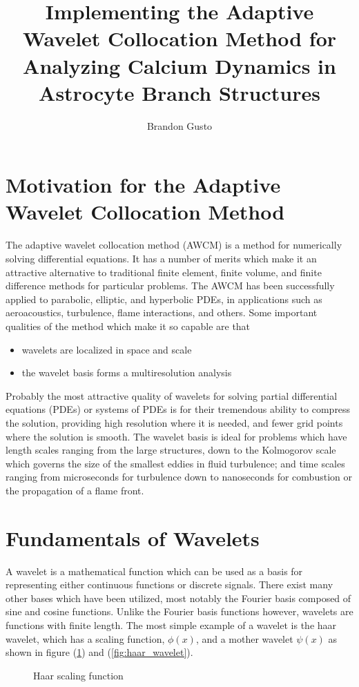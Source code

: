 \documentclass[11pt]{article}
\begin{document}
\title{Implementing the Adaptive Wavelet Collocation Method for Analyzing Calcium Dynamics 
in Astrocyte Branch Structures}
\author{Brandon Gusto \\}

\maketitle
%
\section{Motivation for the Adaptive Wavelet Collocation Method}
The adaptive wavelet collocation method (AWCM) is a method for numerically solving differential equations.
It has a number of merits which make it an attractive alternative to traditional finite element, finite volume, and 
finite difference methods for particular problems. The AWCM has been successfully applied to parabolic, elliptic, and 
hyperbolic PDEs, in applications such as aeroacoustics, turbulence, flame interactions, and others. 
Some important qualities of the method which make it so capable are that
\begin{itemize}
    \item wavelets are localized in space and scale
    \item the wavelet basis forms a multiresolution analysis
\end{itemize} 
Probably the most attractive quality of wavelets for solving partial differential equations (PDEs) or systems of PDEs is for their
tremendous ability to compress the solution, providing high resolution where it is needed, and fewer grid points where the 
solution is smooth. The wavelet basis is ideal for problems which have 
 length scales ranging from the large structures, down to the Kolmogorov scale which governs 
 the size of the smallest eddies in fluid turbulence; and time scales ranging from microseconds for turbulence down 
 to nanoseconds for combustion or the propagation of a flame front.

\section{Fundamentals of Wavelets}
A wavelet is a mathematical function which can be used as a basis for representing either continuous functions or 
discrete signals. There exist many other bases which have been utilized, most notably the Fourier
basis composed of sine and cosine functions.
Unlike the Fourier basis functions however, wavelets are functions with finite length. The most simple example of a wavelet
is the haar wavelet, which has a scaling function, $\phi(x)$, and a mother wavelet $\psi(x)$ as shown in 
figure (\ref{fig:haar_scaling}) and (\ref{fig:haar_wavelet}).
\begin{figure}[H]
	\centering
	
	\caption{Haar scaling function}
	\label{fig:haar_scaling}
\end{figure}
\end{document}
